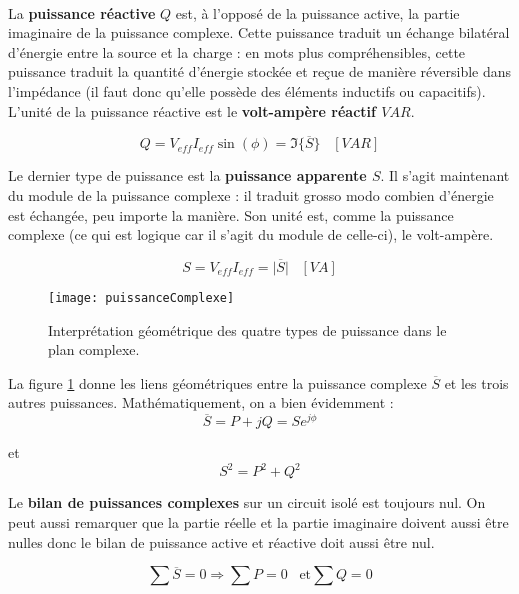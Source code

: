 \hspace{0pt} \\
La \textbf{puissance réactive} $Q$ est, à l'opposé de la puissance active, la partie imaginaire de la puissance complexe. Cette puissance traduit un échange bilatéral d'énergie entre la source et la charge : en mots plus compréhensibles, cette puissance traduit la quantité d'énergie stockée et reçue de manière réversible dans l'impédance (il faut donc qu'elle possède des éléments inductifs ou capacitifs). L'unité de la puissance réactive est le \textbf{volt-ampère réactif $VAR$}.

\begin{equation}
Q = V_{eff}I_{eff}\sin(\phi) = \Im \{\overline{S}\} \; \; \; [VAR]
\end{equation}

Le dernier type de puissance est la \textbf{puissance apparente $S$}. Il s'agit maintenant du module de la puissance complexe : il traduit grosso modo combien d'énergie est échangée, peu importe la manière. Son unité est, comme la puissance complexe (ce qui est logique car il s'agit du module de celle-ci), le volt-ampère.

\begin{equation}
S = V_{eff}I_{eff} = \vert \overline{S} \vert \; \; \; [VA]
\end{equation}

\begin{figure}[h]
	\centering
    \texttt{[image: puissanceComplexe]}
    \caption{Interprétation géométrique des quatre types de puissance dans le plan complexe.}
    \label{puissanceComp}
\end{figure}

La figure \ref{puissanceComp} donne les liens géométriques entre la puissance complexe $\overline{S}$ et les trois autres puissances. Mathématiquement, on a bien évidemment :
\begin{equation}
\overline{S} = P + jQ = Se^{j\phi}
\end{equation}

et
\begin{equation}
S^2 = P^2 + Q^2
\end{equation}

Le \textbf{bilan de puissances complexes} sur un circuit isolé est toujours nul. On peut aussi remarquer que la partie réelle et la partie imaginaire doivent aussi être nulles donc le bilan de puissance active et réactive doit aussi être nul.

\begin{equation}
\sum \overline{S} = 0 \Longrightarrow \sum P = 0 \; \; \; \mathrm{et} \sum Q = 0
\end{equation}

